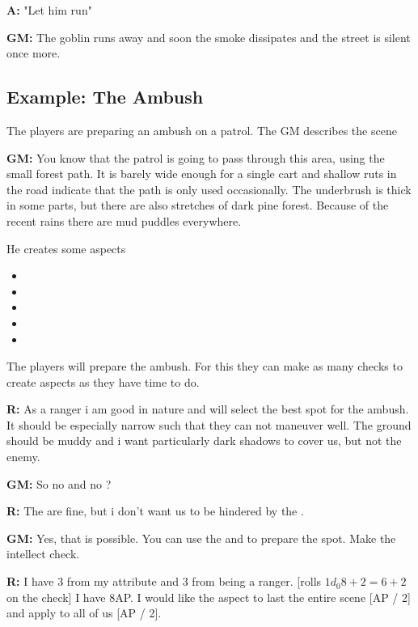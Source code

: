 \documentclass[11pt]{article}
\begin{document}
{\textbf{A:} "Let him run"

\textbf{GM:} The goblin runs away and soon the smoke dissipates and the street is silent once more.
\subsection{Example: The Ambush}
\label{sec:orgb8fbc61}

The players are preparing an ambush on a patrol. The GM describes the scene

\textbf{GM:} You know that the patrol is going to pass through this area, using the small forest path. It is barely wide enough for a single cart and shallow ruts in the road indicate that the path is only used occasionally. The underbrush is thick in some parts, but there are also stretches of dark pine forest. Because of the recent rains there are mud puddles everywhere.

He creates some aspects
\begin{itemize}
\item {}
\item {}
\item {}
\item {}
\item {}
\end{itemize}

The players will prepare the ambush. For this they can make as many checks to create aspects as they have time to do.

\textbf{R:} As a ranger i am good in nature and will select the best spot for the ambush. It should be especially narrow such that they can not maneuver well. The ground should be muddy and i want particularly dark shadows to cover us, but not the enemy.

\textbf{GM:} So no  and no ?

\textbf{R:} The  are fine, but i don't want us to be hindered by the .

\textbf{GM:} Yes, that is possible. You can use the  and  to prepare the spot. Make the intellect check.

\textbf{R:} I have 3 from my attribute and 3 from being a ranger. [rolls \(1 d_0 8 + 2 = 6 + 2\) on the check] I have 8AP. I would like the aspect to last the entire scene [AP / 2] and apply to all of us [AP / 2].

}
\end{document}
